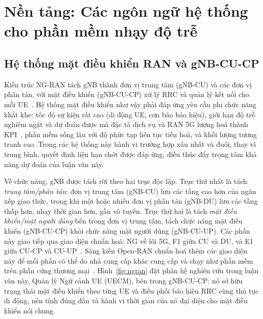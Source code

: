 \chapter{Nền tảng: Các ngôn ngữ hệ thống cho phần mềm nhạy độ trễ\label{chapter:background}}

\section{Hệ thống mặt điều khiển RAN và gNB-CU-CP}\label{sec:ranarch}
Kiến trúc NG-RAN tách gNB thành đơn vị trung tâm (gNB-CU) và các đơn vị phân tán, với mặt
điều khiển (gNB-CU-CP) xử lý RRC và quản lý kết nối cho mỗi
UE~\cite{3gpp38401,3gpp38300,3gpp38331}. Hệ thống mặt điều khiển như vậy phải đáp ứng yêu cầu
phi chức năng khắt khe: tốc độ sự kiện rất cao (di động UE, cơn bão báo hiệu), giới hạn độ trễ
nghiêm ngặt và dự đoán được mà đặc tả dịch vụ và RAN 5G lượng hoá thành
KPI~\cite{3gpp38913,3gpp22261}, phần mềm sống lâu với độ phức tạp liên tục tiến hoá, và khối
lượng tương tranh cao. Trong các hệ thống này hành vi trường hợp xấu nhất và đuôi, thay vì
trung bình, quyết định liệu hạn chót được đáp ứng, điều thúc đẩy trọng tâm khả năng dự đoán
của luận văn này.

Về chức năng, gNB được tách rời theo hai trục độc lập. Trục thứ nhất là tách
\emph{trung tâm/phân tán}: đơn vị trung tâm (gNB-CU) lưu các tầng cao hơn của ngăn xếp giao
thức, trong khi một hoặc nhiều đơn vị phân tán (gNB-DU) lưu các tầng thấp hơn, nhạy thời gian
hơn, gần vô tuyến. Trục thứ hai là tách \emph{mặt điều khiển/mặt người dùng} bên trong đơn vị
trung tâm, tách chức năng mặt điều khiển (gNB-CU-CP) khỏi chức năng mặt người dùng (gNB-CU-UP).
Các phần này giao tiếp qua giao diện chuẩn hoá: NG về lõi 5G, F1 giữa CU và DU, và E1 giữa
CU-CP và CU-UP~\cite{3gpp38401,3gpp38300,3gpp38463}. Sáng kiến Open-RAN chuẩn hoá thêm các
giao diện này để mỗi phần có thể do nhà cung cấp khác cung cấp và chạy như phần mềm trên phần
cứng thương mại~\cite{polese2023oran}. Hình~\ref{fig:ngran} đặt phân hệ nghiên cứu trong luận
văn này, Quản lý Ngữ cảnh UE (UECM), bên trong gNB-CU-CP: nó sở hữu trạng thái mặt điều khiển
theo từng UE và điều phối báo hiệu RRC cùng thủ tục di động, nên tính đúng đắn và hành vi
thời gian của nó đại diện cho mặt điều khiển nói chung.


